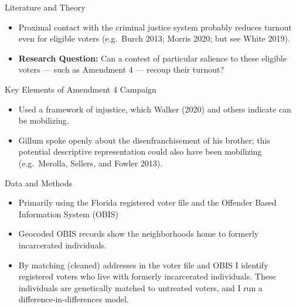 \documentclass[
  ignorenonframetext,
  aspectratio=169]{beamer}
\providecommand{\tightlist}{%
  \setlength{\itemsep}{0pt}\setlength{\parskip}{0pt}}
\begin{document}
\begin{frame}{Literature and Theory}
\protect\hypertarget{literature-and-theory-1}{}
\begin{itemize}[<+->]
\tightlist
\item
  Proximal contact with the criminal justice system probably reduces
  turnout even for eligible voters (e.g.~Burch 2013; Morris 2020; but
  see White 2019).
\end{itemize}

\begin{itemize}[<+->]
\tightlist
\item
  \textbf{Research Question:} Can a contest of particular salience to
  these eligible voters --- such as Amendment 4 --- recoup their
  turnout?
\end{itemize}
\end{frame}

\begin{frame}{Key Elements of Amendment 4 Campaign}
\protect\hypertarget{key-elements-of-amendment-4-campaign}{}
\begin{itemize}[<+->]
\tightlist
\item
  Used a framework of injustice, which Walker (2020) and others indicate
  can be mobilizing.
\end{itemize}

\begin{itemize}[<+->]
\tightlist
\item
  Gillum spoke openly about the disenfranchisement of his brother; this
  potential descriptive representation could also have been mobilizing
  (e.g.~Merolla, Sellers, and Fowler 2013).
\end{itemize}
\end{frame}

\begin{frame}{Data and Methods}
\protect\hypertarget{data-and-methods}{}
\begin{itemize}[<+->]
\tightlist
\item
  Primarily using the Florida registered voter file and the Offender
  Based Information System (OBIS)
\end{itemize}

\begin{itemize}[<+->]
\tightlist
\item
  Geocoded OBIS records show the neighborhoods home to formerly
  incarcerated individuals.
\end{itemize}

\begin{itemize}[<+->]
\tightlist
\item
  By matching (cleaned) addresses in the voter file and OBIS I identify
  registered voters who live with formerly incarcerated individuals.
  These individuals are genetically matched to untreated voters, and I
  run a difference-in-differences model.
\end{itemize}
\end{frame}
\end{document}
